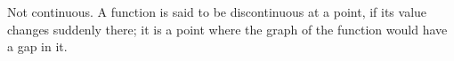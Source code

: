 Not continuous. A function is said to be discontinuous at a point, if its
value changes suddenly there; it is a point where the graph of the function
would have a gap in it.